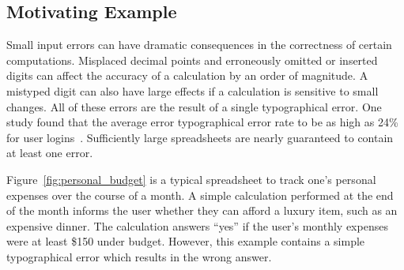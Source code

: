 \subsection{Motivating Example}

Small input errors can have dramatic consequences in the correctness of certain computations.  Misplaced decimal points and erroneously omitted or inserted digits can affect the accuracy of a calculation by an order of magnitude.  A mistyped digit can also have large effects if a calculation is sensitive to small changes.  All of these errors are the result of a single typographical error.  One study found that the average error typographical error rate to be as high as 24\% for user logins~\cite{Robinson:1998:CUV:2229220.2229465}.  Sufficiently large spreadsheets are nearly guaranteed to contain at least one error.

Figure~\ref{fig:personal_budget} is a typical spreadsheet to track one's personal expenses over the course of a month.  A simple calculation performed at the end of the month informs the user whether they can afford a luxury item, such as an expensive dinner.  The calculation answers ``yes'' if the user's monthly expenses were at least \$150 under budget.  However, this example contains a simple typographical error which results in the wrong answer.

